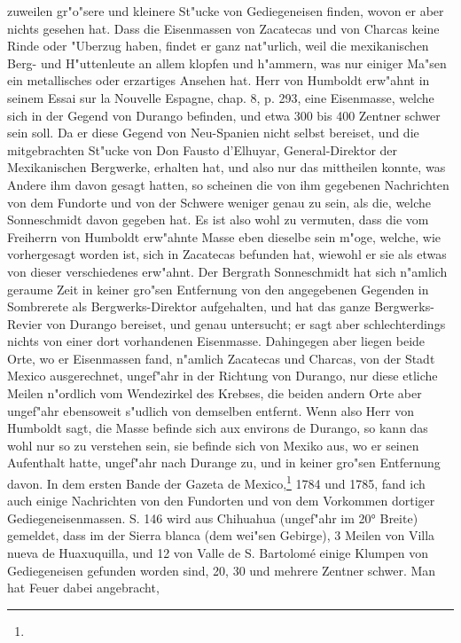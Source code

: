 \documentclass[a4paper, 11pt, oneside, polutonikogreek, german]{article}
\begin{document}
zuweilen gr"o"sere und kleinere St"ucke von Gediegeneisen finden, wovon er aber nichts gesehen hat. Dass die Eisenmassen von Zacatecas und von Charcas keine Rinde oder "Uberzug haben, findet er ganz nat"urlich, weil die mexikanischen Berg- und H"uttenleute an allem klopfen und h"ammern, was nur einiger Ma"sen ein metallisches oder erzartiges Ansehen hat. Herr von Humboldt erw"ahnt in seinem Essai sur la Nouvelle Espagne, chap. 8, p. 293, eine Eisenmasse, welche sich in der Gegend von Durango befinden, und etwa 300 bis 400 Zentner schwer sein soll. Da er diese Gegend von Neu-Spanien nicht selbst bereiset, und die mitgebrachten St"ucke von Don Fausto d'Elhuyar, General-Direktor der Mexikanischen Bergwerke, erhalten hat, und also nur das mittheilen konnte, was Andere ihm davon gesagt hatten, so scheinen die von ihm gegebenen Nachrichten von dem Fundorte und von der Schwere weniger genau zu sein, als die, welche Sonneschmidt davon gegeben hat. Es ist also wohl zu vermuten, dass die vom Freiherrn von Humboldt erw"ahnte Masse eben dieselbe sein m"oge, welche, wie vorhergesagt worden ist, sich in Zacatecas befunden hat, wiewohl er sie als etwas von dieser verschiedenes erw"ahnt. Der Bergrath Sonneschmidt hat sich n"amlich geraume Zeit in keiner gro"sen Entfernung von den angegebenen Gegenden in Sombrerete als Bergwerks-Direktor aufgehalten, und hat das ganze Bergwerks-Revier von Durango bereiset, und genau untersucht; er sagt aber schlechterdings nichts von einer dort vorhandenen Eisenmasse. Dahingegen aber liegen beide Orte, wo er Eisenmassen fand, n"amlich Zacatecas und Charcas, von der Stadt Mexico ausgerechnet, ungef"ahr in der Richtung von Durango, nur diese etliche Meilen n"ordlich vom Wendezirkel des Krebses, die beiden andern Orte aber ungef"ahr ebensoweit s"udlich von demselben entfernt. Wenn also Herr von Humboldt sagt, die Masse befinde sich aux environs de Durango, so kann das wohl nur so zu verstehen sein, sie befinde sich von Mexiko aus, wo er seinen Aufenthalt hatte, ungef"ahr nach Durange zu, und in keiner gro"sen Entfernung davon. In dem ersten Bande der Gazeta de Mexico,\footnote{} 1784 und 1785, fand ich auch einige Nachrichten von den Fundorten und von dem Vorkommen dortiger Gediegeneisenmassen. S. 146 wird aus Chihuahua (ungef"ahr im 20° Breite) gemeldet, dass im der Sierra blanca (dem wei"sen Gebirge), 3 Meilen von Villa nueva de Huaxuquilla, und 12 von Valle de S. Bartolomé einige Klumpen von Gediegeneisen gefunden worden sind, 20, 30 und mehrere Zentner schwer. Man hat Feuer dabei angebracht, 
\end{document}
